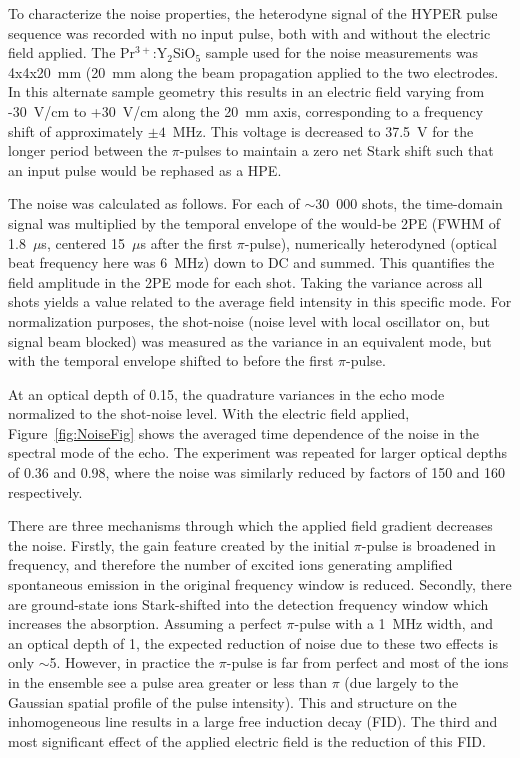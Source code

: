                                                                                                                                                                                                                                                                                                                                                                                                                                                                                                                                                                                                                                                                                                                                                                                                                                                                                                                                                                                                                                                                                                                                                                                                                                                                                                                                                                                                                                                                                                                                                                                                                                                                                                                                                                                                                                                                                                                                                                                                                                                                                                                                                                                                                                                                                                                                                                                                                                                                                                                                                                                                                                                                                                                                                                                                                                                                                                                                                                                                                                                                                                                                                                                                                                                                                                                                                                                                                                                                                                                                                                                                                                                                                                                                                                                                                                                                                                                                                                                                                                                                                                                                                                                                                                                                                                                                                                                                                                                                                                                                                                                                                                                                                                                                                                                                                                                                                                                                                                                                                                                                                                                                                                                                                                                                                                                                                                                                                                                                                                                                                                                                                                                                                                                                                                                                                                                                                                                                                                                                                                                                                                                                                                                                                                                                                                                                                                                                                                                                                                                                                                                                                                                                                                                                                                                                                                                                                                                                                                                                                                                                                                                                                                                                                                                                                                                                                                                                                                                                                                                                                                                                                                                                                                                                                                                                                                                                                                                                                                                                                                                                                                                                                                                                                                                                                                                                                                                                                                                                                                                                                                                                                                                                                                                                                                                                                                                                                                                                                                                                                                                                                                                                                                                                                                                                                                                                                                                                                                                                                                                                                                                                                                                                                                                                                                                                                                                                                                                                                                                                                                                                                                                                                                                                                                                                                                                                                                                                                                                                                                                                                                                                                                                                                                                                                                                                                                                                                                                                                                                                                                                                                                                                                                                                                                                                                                                                                                                                                                                                                                                                                                                                                                                                                                                                                                                                                                                                                                                                                                                                                                                                                                                                                                                                                                                                                                                                                                                                                                                                                                                                                                                                                                                                                                                                                                                                                                                                                                                                                                                                                                                                                                                                                                                                                                                                                                                                                                                                                                                                                                                                                                                                                                                                                                                                                                                                                                                                                                                                                                                                                                                                                                                                                                                                                                                                                                                                                                                                                                                                                                                                                                                                                                                                                                                                                                                                                                                                                                                                                                                                                                                                                                                                                                                                                                                                                                                                                                                                                                                                                                                                                                                                                                                                                                                                                                                                                                                                                                                                                                                                                                                                                                                                                                                                                                                                                                                                                                                                                                                                                                                                                                                                                                                                                                                                                                                                                                                                                                                                                                                                                                                                                                                                                                                                                                                                                                                                                                                                                                                                                                                                                                                                                                                                                                                                                                                                                                                                                                                                                                                                                                                                                                                                                                                                                                                                                                                                                                                                                                                                                                                                                                                                                                                                                                                                                                                                                                                                                                                                                                                                                                                                                                                                                                                                                                                                                                                                                                                                                                                                                                                                                                                                                                                                                                                                                                                                                                                                                                                                                                                                                                                                                                                                                                                                                                                                                                                                                                                                                                                                                                                                                                                                                                                                                                                                                                                                                                                                                                                                                                                                                                                                                                                                                                                                                                                                                                                                                                                                                                                                                                                                                                                                                                                                                                                                                                                                                                                                                                                                                                                                                                                                                                                                                                                                                                                                                                                                                                                                                                                                                                                                                                                                                                                                                                                                                                                                                                                                                                                                                                                                                                                                                                                                                                                                                                                                                                                                                                                                                                                                                                                                                                                                                                                                                                                                                                                                                                                                                                                                                                                                                                                                                                                                                                                                                                                                                                                                                                                                                                                                                                                                                                                                                                                                                                                                                                                                                                                                                                                                                                                                                                                                                                                                                                                                                                                                                                                                                                                                                                                                                                                                                                                                                                                                                                                                                                                                                                                                                                                                                                                                                                                                                                                                                                                                                                                                                                                                                                                                                                                                                                                                                                                                                                                                                                                                                                                                                                                                                                                                                                                                                                                                                                                                                                                                                                                                                                                                                                                                                                                                                                                                                                                                                                                                                                                                                                                                                                                                                                                                                                                                                                                                                                                                                                                                                                                                                                                                                                                                                                                                                                                                                                                                                                                                                                                                                                                                                                                                                                                                                                                                                                                                                                                                                                                                                                                                                                                                                                                                                                                                                                                                                                                                                                                                                                                                                                                                                                                                                                                                                                                                                                                                                                                                                                                                                                                                                                                                                                                                                                                                                                                                                                                                                                                                                                                                                                                                                                                                                                                                                                                                                                                                                                                                                                                                                                                                                                                                                                                                                                                                                                                                                                                                                                                                                                                                                                                                                                                                                                                                                                                                                                                                                                                                                                                                                                                                                                                                                                                                                                                                                                                                                                                                                                                                                                                                                                                                                                                                                                                                                                                                                                                                                                                                                                                                                                                                                                                                                                                                                                                                                                                                                                                                                                                                                                                                                                                                                                                                                                                                                                                                                                                                                                                                                                                                                                                                                                                                                                                                                                                                                                                                                                                                                                                                                                                                                                                                                                                                                                                                                                                                                                                                                                                                                                                                                                                                                                                                                                                                                                                                                                                                                                                                                                                                                                                                                                                                                                                                                                                                                                                                                                                                                                                                                                                                                                                                                                                                                                                                                                                                                                                                                                                                                                                                                                                                                                                                                                                                                                                                                                                                                                                                                                                                                                                                                                                                                                                                                                                                                                                                                                                                                                                                                                                                                                                                                                                                                                                                                                                                                                                                                                                                                                                                                                                                                                                                                                                                                                                                                                                                                                                                                                                                                                                                                                                                                                                                                                                                                                                                                                                                                                                                                                                                                                                                                                                                                                                                                                                                                                                                                                                                                                                                                                                                                                                                                                                                                                                                                                                                                                                                                                                                                                                                                                                                                                                                                                                                                                                                                                                                                                                                                                                                                                                                                                                                                                                                                                                                                                                                                                                                                                                                                                                                                                                                                                                                                                                                                                                                                                                                                                                                                                                                                                                                                                                                                                                                                                                                                                                                                                                                                                                                                                                                                                                                                                                                                                                                                                                                                                                                                                                                                                                                                                                                                                                                                                                                                                                                                                                                                                                                                                                                                                                                                                                                                                                                                                                                                                                                                                                                                                                                                                                                                                                                                                                                                                                                                                                                                                                                                                                                                                                                                                                                                                                                                                                                                                                                                                                                                                                                                                                                                                                                                                                                                                                                                                                                                                                                                                                                                                                                                                                                                                                                                                                                                                                                                                                                                                                                                                                                                                                                                                                                                                                                                                                                                                                                                                                                                                                                                                                                                                                                                                                                                                                                                                                                                                                                                                                                                                                                                                                                                                                                                                                                                                                                                                                                                                                                                                                                                                                                                                                                                                                                                                                                                                                                                                                                                                                                                                                                                                                                                                                                                                                                                                                                                                                                                                                                                                                                                                                                                                                                                                                                                                                                                                                                                                                                                                                                                                                                                                                                                                                                                                                                                                                                                                                                                                                                                                                                                                                                                                                                                                                                                                                                                                                                                                                                                                                                                                                                                                                                                                                                                                                                                                                                                                                                                                                                                                                                                                                                                                                                                                                                                                                                                                                                                                                                                                                                                                                                                                                                                                                                                                                                                                                                                                                                                                                                                                                                                                                                                                                                                                                                                                                                                                                                                                                                                                                                                                                                                                                                                                                                                                                                                                                                                                                                                                                                                                                                                                                    \documentclass[superscriptaddress,pra,twocolumn,showpacs,amsmath,amssymb,aps,a4paper]{revtex4}
\newcommand{\PRYSO}{Pr$^{3+}$:Y$_2$SiO$_5$ }
\begin{document}
To characterize the noise properties, the heterodyne signal of the
HYPER pulse sequence was recorded with no input pulse, both with and
without the electric field applied. The \PRYSO sample used for the
noise measurements was 4x4x20~mm (20~mm along the beam propagation
 %
applied to the two electrodes. In this alternate sample geometry
this results in an electric field varying from -30~V/cm to
+30~V/cm along the 20~mm axis, corresponding to a frequency shift
of approximately $\pm4$~MHz.  This voltage is decreased to 37.5~V for the longer
period between the $\pi$-pulses to maintain a zero net Stark shift
such that an input pulse would be rephased as a HPE.


The noise was calculated as follows. For each of $\sim$30~000 shots,
the time-domain signal was multiplied by the temporal envelope of the
would-be 2PE (FWHM of 1.8~$\mu$s, centered 15~$\mu$s after the first
$\pi$-pulse), numerically heterodyned (optical beat frequency here was
6~MHz) down to DC and summed. This quantifies the field amplitude in
the 2PE mode for each shot. Taking the variance across all shots
yields a value related to the average field intensity in this specific
mode. For normalization purposes, the shot-noise (noise level with local
oscillator on, but signal beam blocked) was measured as the variance in an
equivalent mode, but with the temporal envelope shifted to before the
first $\pi$-pulse.

At an optical depth of 0.15, the quadrature variances in the echo mode
 %
normalized to the shot-noise level.  With the electric field applied,
 %
Figure~\ref{fig:NoiseFig} shows the averaged time dependence of the
noise in the spectral mode of the echo. The experiment was repeated
for larger optical depths of 0.36 and 0.98, where the noise was
similarly reduced by factors of 150 and 160 respectively.

There are three mechanisms through which the applied field gradient
decreases the noise.  Firstly, the gain feature created by the initial
$\pi$-pulse is broadened in frequency, and therefore the number of
excited ions generating amplified spontaneous emission in the original
frequency window is reduced. Secondly, there are ground-state ions
Stark-shifted into the detection frequency window which increases the
absorption. Assuming a perfect $\pi$-pulse with a 1~MHz width, and an
optical depth of 1, the expected reduction of noise due to these two
effects is only $\sim$5. However, in practice the $\pi$-pulse is far
from perfect and most of the ions in the ensemble see a pulse area
greater or less than $\pi$ (due largely to the Gaussian spatial
profile of the pulse intensity). This and structure on the
inhomogeneous line results in a large free induction decay (FID). The
third and most significant effect of the applied electric field is the
reduction of this FID.
\end{document}
